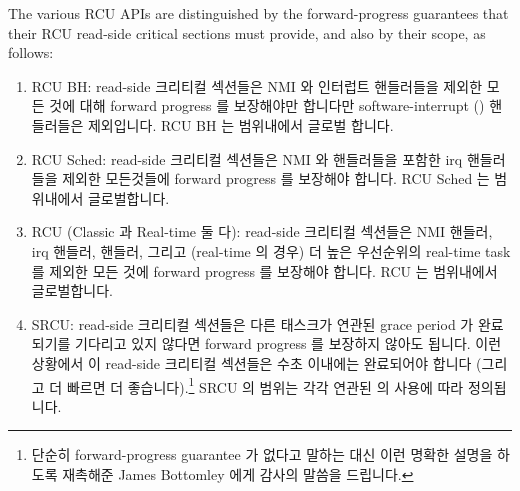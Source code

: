 The various RCU APIs are distinguished by the forward-progress
guarantees that their RCU read-side critical sections must provide,
and also by their scope, as follows:
\fi

\begin{enumerate}
\item	RCU BH: read-side 크리티컬 섹션들은 NMI 와 인터럽트 핸들러들을 제외한
	모든 것에 대해 forward progress 를 보장해야만 합니다만
	software-interrupt () 핸들러들은 제외입니다.
	RCU BH 는 범위내에서 글로벌 합니다.
\item	RCU Sched: read-side 크리티컬 섹션들은 NMI 와  핸들러들을
	포함한 irq 핸들러들을 제외한 모든것들에 forward progress 를 보장해야
	합니다.
	RCU Sched 는 범위내에서 글로벌합니다.
\item	RCU (Classic 과 Real-time 둘 다): read-side 크리티컬 섹션들은 NMI
	핸들러, irq 핸들러,  핸들러, 그리고 (real-time 의 경우) 더
	높은 우선순위의 real-time task 를 제외한 모든 것에 forward progress 를
	보장해야 합니다.
	RCU 는 범위내에서 글로벌합니다.
\item	SRCU: read-side 크리티컬 섹션들은 다른 태스크가 연관된 grace
	period 가 완료되기를 기다리고 있지 않다면 forward progress 를 보장하지
	않아도 됩니다. 이런 상황에서 이 read-side 크리티컬 섹션들은 수초
	이내에는 완료되어야 합니다 (그리고 더 빠르면 더 좋습니다).\footnote{
		단순히 forward-progress guarantee 가 없다고 말하는 대신 이런
		명확한 설명을 하도록 재촉해준 James Bottomley 에게 감사의
		말씀을 드립니다.}
	SRCU 의 범위는 각각 연관된  의 사용에 따라 정의됩니다.
\iffalse

\item	RCU BH: read-side critical sections
	must guarantee forward progress against everything except for
	NMI and interrupt handlers, but not including software-interrupt
	(\co{softirq}) handlers.
	RCU BH is global in scope.
\item	RCU Sched: read-side critical sections must guarantee forward
	progress against everything except for NMI and irq handlers,
	including \co{softirq} handlers.
	RCU Sched is global in scope.
\item	RCU (both classic and real-time): read-side critical sections
	must guarantee forward progress against everything except for
	NMI handlers, irq handlers, \co{softirq} handlers, and (in the
	real-time case) higher-priority real-time tasks.
	RCU is global in scope.
\item	SRCU: read-side critical sections need not guarantee
	forward progress unless some other task is waiting for the
	corresponding grace period to complete, in which case these
	read-side critical sections should complete in no more than
	a few seconds (and preferably much more quickly).\footnote{
		Thanks to James Bottomley for urging me to this
		formulation, as opposed to simply saying that
		there are no forward-progress guarantees.}
	SRCU's scope is defined by the use of the corresponding
	\co{srcu_struct}.
\fi
\end{enumerate}

